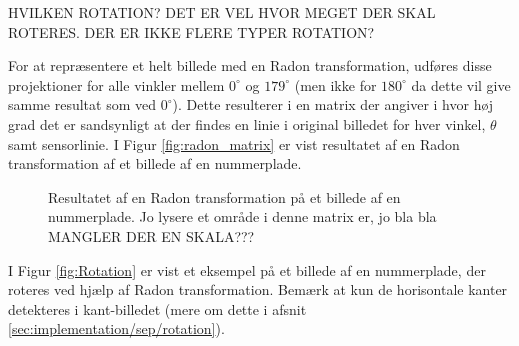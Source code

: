 HVILKEN ROTATION? DET ER VEL HVOR MEGET DER SKAL ROTERES. DER ER IKKE FLERE TYPER ROTATION?

For at repræsentere et helt billede med en Radon transformation, udføres disse projektioner for alle vinkler mellem $0^{\circ}$ og $179^{\circ}$ (men ikke for $180^{\circ}$ da dette vil give samme resultat som ved $0^{\circ}$). Dette resulterer i en matrix der angiver i hvor høj grad det er sandsynligt at der findes en linie i original billedet for hver vinkel, $\theta$ samt sensorlinie. I Figur \vref{fig:radon_matrix} er vist resultatet af en Radon transformation af et billede af en nummerplade.

\begin{figure}[htp]
  \centering
  \caption{Resultatet af en Radon transformation på et billede af en nummerplade. Jo lysere et område i denne matrix er, jo bla bla MANGLER DER EN SKALA???}
  \label{fig:radon_matrix}
\end{figure}

I Figur \vref{fig:Rotation} er vist et eksempel på et billede af en nummerplade, der roteres ved hjælp af Radon transformation. Bemærk at kun de horisontale kanter detekteres i kant-billedet (mere om dette i afsnit \vref{sec:implementation/sep/rotation}).

